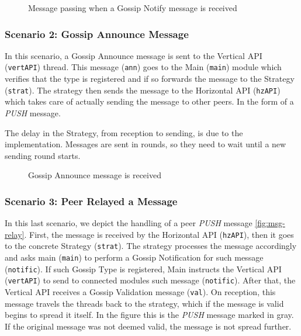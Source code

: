 \documentclass[a4paper,english,10pt,NET]{tumarticle}
\begin{document}
\begin{figure}
	\centering
	
	\caption{Message passing when a Gossip Notify message is received}
	\label{fig:msg-notify}
\end{figure}

\subsubsection{Scenario 2: Gossip Announce Message}

In this scenario, a Gossip Announce message is sent to the Vertical API (\texttt{vertAPI}) thread. This message (\texttt{ann}) goes to the Main (\texttt{main}) module which verifies that the type is registered and if so forwards the message to the Strategy (\texttt{strat}). The strategy then sends the message to the Horizontal API (\texttt{hzAPI}) which takes care of actually sending the message to other peers. In the form of a \textit{PUSH} message. 

The delay in the Strategy, from reception to sending, is due to the implementation. Messages are sent in rounds, so they need to wait until a new sending round starts.

\begin{figure}
	\centering
	
	\caption{Gossip Announce message is received}
	\label{fig:msg-announce}
\end{figure}


\subsubsection{Scenario 3: Peer Relayed a Message}

In this last scenario, we depict the handling of a peer \textit{PUSH} message \cref{fig:msg-relay}. First, the message is received by the Horizontal API (\texttt{hzAPI}), then it goes to the concrete Strategy (\texttt{strat}). The strategy processes the message accordingly and asks main (\texttt{main}) to perform a Gossip Notification for such message (\texttt{notific}). If such Gossip Type is registered, Main instructs the Vertical API (\texttt{vertAPI}) to send to connected modules such message (\texttt{notific}). After that, the Vertical API receives a Gossip Validation message (\texttt{val}). On reception, this message travels the threads back to the strategy, which if the message is valid begins to spread it itself. In the figure this is the \textit{PUSH} message marked in gray. If the original message was not deemed valid, the message is not spread further.
\end{document}

